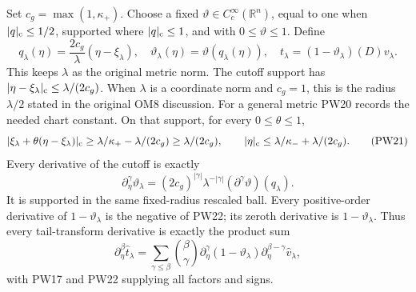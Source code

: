 \documentclass[
  11pt,
]{article}
\begin{document}
Set \(c_g=\max(1,\kappa_+)\). Choose a fixed
\(\vartheta\in C_c^\infty(\mathbb R^n)\), equal to one when
\(|q|_{\rm c}\leq1/2\), supported where \(|q|_{\rm c}\leq1\), and with
\(0\leq\vartheta\leq1\). Define \[
 q_\lambda(\eta)=\frac{2c_g}{\lambda}(\eta-\xi_\lambda),
 \quad
 \vartheta_\lambda(\eta)=\vartheta(q_\lambda(\eta)),
 \quad
 t_\lambda=(1-\vartheta_\lambda)(D)v_\lambda .
 \tag{PW20}
\] This keeps \(\lambda\) as the original metric norm. The cutoff
support has \(|\eta-\xi_\lambda|_{\rm c}\leq\lambda/(2c_g)\). When
\(\lambda\) is a coordinate norm and \(c_g=1\), this is the radius
\(\lambda/2\) stated in the original OM8 discussion. For a general
metric PW20 records the needed chart constant. On that support, for
every \(0\leq\theta\leq1\), \[
 |\xi_\lambda+\theta(\eta-\xi_\lambda)|_{\rm c}
 \geq \lambda/\kappa_+-\lambda/(2c_g)
 \geq \lambda/(2c_g),\qquad
 |\eta|_{\rm c}\leq\lambda/\kappa_-+\lambda/(2c_g).
 \tag{PW21}
\] Every derivative of the cutoff is exactly \[
 \partial_\eta^\gamma\vartheta_\lambda
   =(2c_g)^{|\gamma|}\lambda^{-|\gamma|}
       (\partial^\gamma\vartheta)(q_\lambda).
 \tag{PW22}
\] It is supported in the same fixed-radius rescaled ball. Every
positive-order derivative of \(1-\vartheta_\lambda\) is the negative of
PW22; its zeroth derivative is \(1-\vartheta_\lambda\). Thus every
tail-transform derivative is exactly the product sum \[
 \partial_\eta^\beta\widehat t_\lambda
   =\sum_{\gamma\leq\beta}{\beta\choose\gamma}
       \partial_\eta^\gamma(1-\vartheta_\lambda)
       \partial_\eta^{\beta-\gamma}\widehat v_\lambda ,
 \tag{PW23}
\] with PW17 and PW22 supplying all factors and signs.
\end{document}

